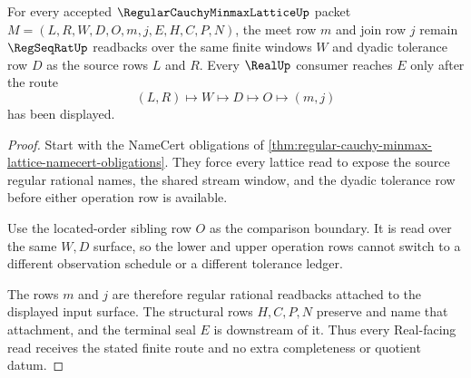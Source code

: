 \begin{theorem}
\label{thm:regular-cauchy-minmax-lattice-regseqrat-stability}
For every accepted $\RegularCauchyMinmaxLatticeUp$ packet $M=(L,R,W,D,O,m,j,E,H,C,P,N)$, the meet row $m$ and join row $j$ remain $\RegSeqRatUp$ readbacks over the same finite windows $W$ and dyadic tolerance row $D$ as the source rows $L$ and $R$. Every $\RealUp$ consumer reaches $E$ only after the route
$$
(L,R)\longmapsto W\longmapsto D\longmapsto O\longmapsto (m,j)
$$
has been displayed.
\end{theorem}
\begin{proof}
Start with the NameCert obligations of \autoref{thm:regular-cauchy-minmax-lattice-namecert-obligations}. They force every lattice read to expose the source regular rational names, the shared stream window, and the dyadic tolerance row before either operation row is available.

Use the located-order sibling row $O$ as the comparison boundary. It is read over the same $W,D$ surface, so the lower and upper operation rows cannot switch to a different observation schedule or a different tolerance ledger.

The rows $m$ and $j$ are therefore regular rational readbacks attached to the displayed input surface. The structural rows $H,C,P,N$ preserve and name that attachment, and the terminal seal $E$ is downstream of it. Thus every Real-facing read receives the stated finite route and no extra completeness or quotient datum.
\end{proof}


\begin{closurestatus}{\RegularCauchyMinmaxLatticeUp}
  \theoryclosure{\seedClosure}
  \formalstatus{\unformalizedV}
\end{closurestatus}
